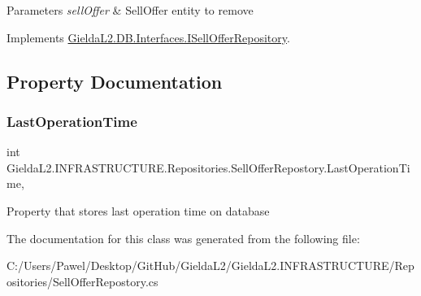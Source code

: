 \begin{DoxyParams}{Parameters}
{\em sell\+Offer} & Sell\+Offer entity to remove\\
\hline
\end{DoxyParams}


Implements \mbox{\hyperlink{interface_gielda_l2_1_1_d_b_1_1_interfaces_1_1_i_sell_offer_repository_ab77d59db7295ed7a3c7457f8cc0d84d2}{Gielda\+L2.\+D\+B.\+Interfaces.\+I\+Sell\+Offer\+Repository}}.



\subsection{Property Documentation}
\mbox{\label{class_gielda_l2_1_1_i_n_f_r_a_s_t_r_u_c_t_u_r_e_1_1_repositories_1_1_sell_offer_repostory_af456365d00cc4fcbb2f280ec86dc1a1c}} 
\subsubsection{\texorpdfstring{LastOperationTime}{LastOperationTime}}
{\footnotesize\ttfamily int Gielda\+L2.\+I\+N\+F\+R\+A\+S\+T\+R\+U\+C\+T\+U\+R\+E.\+Repositories.\+Sell\+Offer\+Repostory.\+Last\+Operation\+Time\hspace{0.3cm}{\ttfamily [get]}, {\ttfamily [set]}}



Property that stores last operation time on database 



The documentation for this class was generated from the following file\+:\begin{DoxyCompactItemize}
\item 
C\+:/\+Users/\+Pawel/\+Desktop/\+Git\+Hub/\+Gielda\+L2/\+Gielda\+L2.\+I\+N\+F\+R\+A\+S\+T\+R\+U\+C\+T\+U\+R\+E/\+Repositories/Sell\+Offer\+Repostory.\+cs\end{DoxyCompactItemize}
